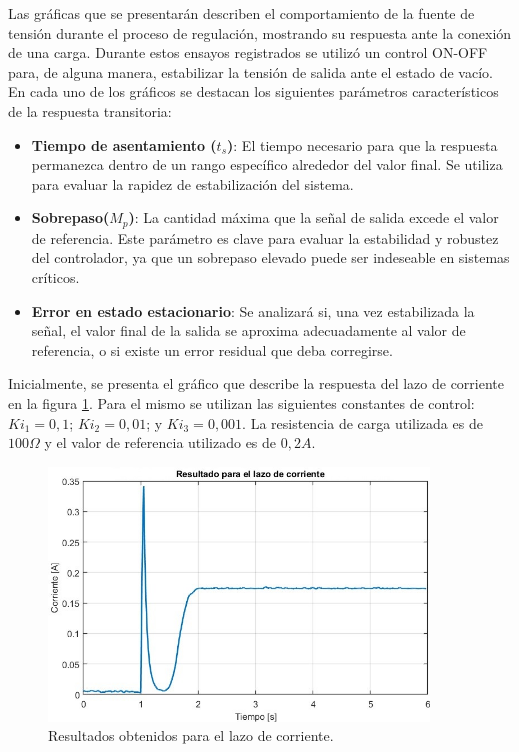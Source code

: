 Las gráficas que se presentarán describen el comportamiento de la fuente de tensión durante el proceso de regulación, mostrando su respuesta ante la conexión de una carga. Durante estos ensayos registrados se utilizó un control ON-OFF para, de alguna manera, estabilizar la tensión de salida ante el estado de vacío. En cada uno de los gráficos se destacan los siguientes parámetros característicos de la respuesta transitoria:
\begin{itemize}
	\item \textbf{Tiempo de asentamiento ($t_s$)}: El tiempo necesario para que la respuesta permanezca dentro de un rango específico alrededor del valor final. Se utiliza para evaluar la rapidez de estabilización del sistema.
	\item \textbf{Sobrepaso($M_p$)}: La cantidad máxima que la señal de salida excede el valor de referencia. Este parámetro es clave para evaluar la estabilidad y robustez del controlador, ya que un sobrepaso elevado puede ser indeseable en sistemas críticos.
	\item \textbf{Error en estado estacionario}: Se analizará si, una vez estabilizada la señal, el valor final de la salida se aproxima adecuadamente al valor de referencia, o si existe un error residual que deba corregirse.
\end{itemize}\par 
Inicialmente, se presenta el gráfico que describe la respuesta del lazo de corriente en la figura \ref{F:Resultados obtenidos para el lazo de corriente}. Para el mismo se utilizan las siguientes constantes de control: $Ki_1=0,1$; $Ki_2=0,01$; y $Ki_3=0,001$. La resistencia de carga utilizada es de $100 \Omega$ y el valor de referencia utilizado es de $0,2A$. 
\begin{figure}[htbp]
    \centering
    \includegraphics[width=0.9\textwidth]{./imagenes/NF5_lazo_corriente.jpg}
    \caption{Resultados obtenidos para el lazo de corriente.}
    \label{F:Resultados obtenidos para el lazo de corriente}
\end{figure}\par 
